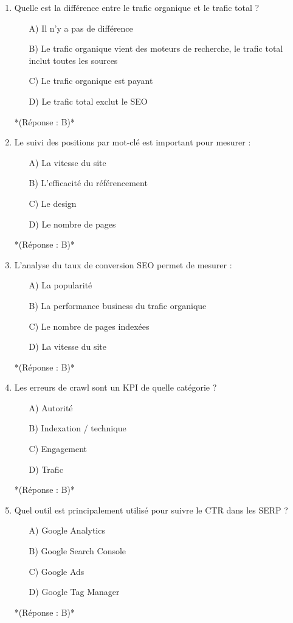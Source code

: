 \documentclass[12pt,a4paper,twoside]{report}
\begin{document}
\begin{enumerate}
    \item Quelle est la différence entre le trafic organique et le trafic total ?
    \begin{itemize}
        \item[A)] Il n'y a pas de différence
        \item[B)] Le trafic organique vient des moteurs de recherche, le trafic total inclut toutes les sources
        \item[C)] Le trafic organique est payant
        \item[D)] Le trafic total exclut le SEO
    \end{itemize}
    *(Réponse : B)*

    \item Le suivi des positions par mot-clé est important pour mesurer :
    \begin{itemize}
        \item[A)] La vitesse du site
        \item[B)] L'efficacité du référencement
        \item[C)] Le design
        \item[D)] Le nombre de pages
    \end{itemize}
    *(Réponse : B)*

    \item L'analyse du taux de conversion SEO permet de mesurer :
    \begin{itemize}
        \item[A)] La popularité
        \item[B)] La performance business du trafic organique
        \item[C)] Le nombre de pages indexées
        \item[D)] La vitesse du site
    \end{itemize}
    *(Réponse : B)*

    \item Les erreurs de crawl sont un KPI de quelle catégorie ?
    \begin{itemize}
        \item[A)] Autorité
        \item[B)] Indexation / technique
        \item[C)] Engagement
        \item[D)] Trafic
    \end{itemize}
    *(Réponse : B)*

    \item Quel outil est principalement utilisé pour suivre le CTR dans les SERP ?
    \begin{itemize}
        \item[A)] Google Analytics
        \item[B)] Google Search Console
        \item[C)] Google Ads
        \item[D)] Google Tag Manager
    \end{itemize}
    *(Réponse : B)*


\end{enumerate}
\end{document}
